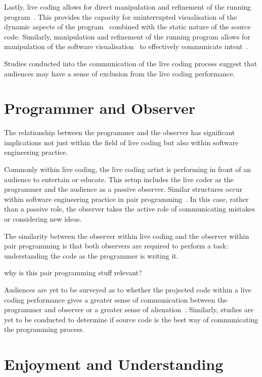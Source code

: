 Lastly, live coding allows for direct manipulation and refinement of the running program~\cite{Swift2013}. This provides the capacity for uninterrupted visualisation of the dynamic aspects of the program~ combined with the static nature of the source code. Similarly, manipulation and refinement of the running program allows for manipulation of the software visualisation~\cite{McLean2010a} to effectively communicate intent~.

{\color{red} Studies conducted into the communication of the live coding process suggest that audiences may have a sense of exclusion from the live coding performance.}

\section{Programmer and Observer}

The relationship between the programmer and the observer has significant implications not just within the field of live coding but also within software engineering practice.

Commonly within live coding, the live coding artist is performing in front of an audience to entertain or educate. This setup includes the live coder as the programmer and the audience as a passive observer. Similar structures occur within software engineering practice in pair programming~. In this case, rather than a passive role, the observer takes the active role of communicating mistakes or considering new ideas.

The similarity between the observer within live coding and the observer within pair programming is that both observers are required to perform a task: understanding the code as the programmer is writing it.

{\color{red} why is this pair programming stuff relevant?}

Audiences are yet to be surveyed as to whether the projected code within a live coding performance gives a greater sense of communication between the programmer and observer or a greater sense of alienation~\cite{Mclean2011}. Similarly, studies are yet to be conducted to determine if source code is the best way of communicating the programming process.

\more

\section{Enjoyment and Understanding}

